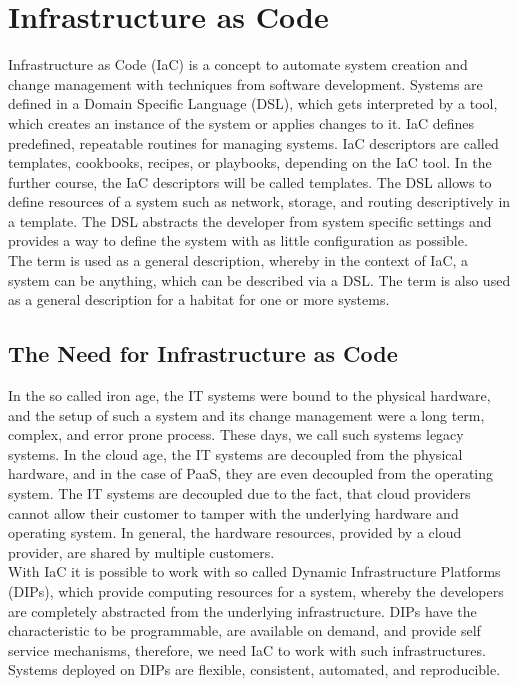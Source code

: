 \chapter{Infrastructure as Code}
\label{cha:iac}
Infrastructure as Code (IaC) is a concept to automate system creation and change management with techniques from software development. Systems are defined in a Domain Specific Language (DSL), which gets interpreted by a tool, which creates an instance of the system or applies changes to it. IaC defines predefined, repeatable routines for managing systems. IaC descriptors are called templates, cookbooks, recipes, or playbooks, depending on the IaC tool. In the further course, the IaC descriptors will be called templates. The DSL allows to define resources of a system such as network, storage, and routing descriptively in a template. The DSL abstracts the developer from system specific settings and provides a way to define the system with as little configuration as possible\cite{Morris2016}. \\

The term  is used as a general description, whereby in the context of IaC, a system can be anything, which can be described via a DSL. The term  is also used as a general description for a habitat for one or more systems.  

\section{The Need for Infrastructure as Code}
\label{sec:iac-need}
In the so called iron age, the IT systems were bound to the physical hardware, and the setup of such a system and its change management were a long term, complex, and error prone process. These days, we call such systems legacy systems. In the cloud age, the IT systems are decoupled from the physical hardware, and in the case of PaaS, they are even decoupled from the operating system. The IT systems are decoupled due to the fact, that cloud providers cannot allow their customer to tamper with the underlying hardware and operating system. In general, the hardware resources, provided by a cloud provider, are shared by multiple customers\cite{Morris2016}. \\

With IaC it is possible to work with so called Dynamic Infrastructure Platforms (DIPs), which provide computing resources for a system, whereby the developers are completely abstracted from the underlying infrastructure. DIPs have the characteristic to be programmable, are available on demand, and provide self service mechanisms, therefore, we need IaC to work with such infrastructures. Systems deployed on DIPs are flexible, consistent, automated, and reproducible\cite{Morris2016}. \\

